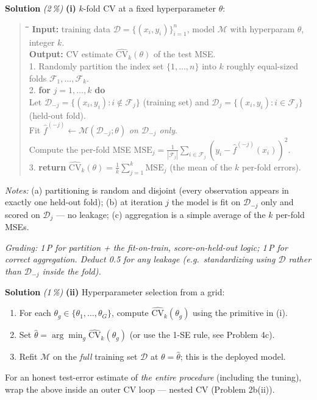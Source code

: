 \documentclass[11pt,a4paper]{article}
\newcommand{\subpoints}[1]{\textit{(#1\,\%)}}
\newcommand{\sol}{\noindent\textbf{Solution}}
\begin{document}
\sol{} \subpoints{2} \textbf{(i)} $k$-fold CV at a fixed hyperparameter $\theta$:
\begin{quote}\small
\begin{tabbing}
\hspace{1.5em}\=\hspace{1.5em}\=\hspace{1.5em}\=\hspace{1.5em}\=\kill
\textbf{Input:} training data $\mathcal D = \{(x_i, y_i)\}_{i=1}^n$, model $\mathcal M$ with hyperparam $\theta$, integer $k$. \\
\textbf{Output:} CV estimate $\widehat{\mathrm{CV}}_k(\theta)$ of the test MSE. \\[4pt]
1. Randomly partition the index set $\{1,\ldots,n\}$ into $k$ roughly equal-sized folds $\mathcal F_1, \ldots, \mathcal F_k$.\\
2. \textbf{for} $j = 1, \ldots, k$ \textbf{do}\\
 Let $\mathcal D_{-j} = \{(x_i,y_i): i \notin \mathcal F_j\}$ (training set) and $\mathcal D_j = \{(x_i,y_i): i\in\mathcal F_j\}$ (held-out fold).\\
 Fit $\hat f^{(-j)} \leftarrow \mathcal M(\mathcal D_{-j}; \theta)$ \emph{on $\mathcal D_{-j}$ only}.\\
 Compute the per-fold MSE $\mathrm{MSE}_j = \tfrac{1}{|\mathcal F_j|}\sum_{i\in\mathcal F_j}(y_i - \hat f^{(-j)}(x_i))^2$.\\
3. \textbf{return} $\widehat{\mathrm{CV}}_k(\theta) = \tfrac{1}{k}\sum_{j=1}^k \mathrm{MSE}_j$ (the mean of the $k$ per-fold errors).
\end{tabbing}
\end{quote}
\emph{Notes:} (a) partitioning is random and disjoint (every observation appears in exactly one
held-out fold); (b) at iteration $j$ the model is fit on $\mathcal D_{-j}$ only and scored on
$\mathcal D_j$ --- no leakage; (c) aggregation is a simple average of the $k$ per-fold MSEs.

\noindent\emph{Grading: 1\,P for partition + the fit-on-train, score-on-held-out logic; 1\,P for
correct aggregation. Deduct 0.5 for any leakage (e.g.\ standardizing using $\mathcal D$ rather
than $\mathcal D_{-j}$ inside the fold).}

\medskip
\sol{} \subpoints{1} \textbf{(ii)} Hyperparameter selection from a grid:
\begin{enumerate}
  \item For each $\theta_g \in \{\theta_1, \ldots, \theta_G\}$, compute $\widehat{\mathrm{CV}}_k(\theta_g)$ using the primitive in (i).
  \item Set $\hat\theta = \arg\min_g \widehat{\mathrm{CV}}_k(\theta_g)$ (or use the 1-SE rule, see Problem 4c).
  \item Refit $\mathcal M$ on the \emph{full} training set $\mathcal D$ at $\theta = \hat\theta$; this is the deployed model.
\end{enumerate}
For an honest test-error estimate of \emph{the entire procedure} (including the tuning), wrap the
above inside an outer CV loop --- nested CV (Problem 2b(ii)).
\end{document}
